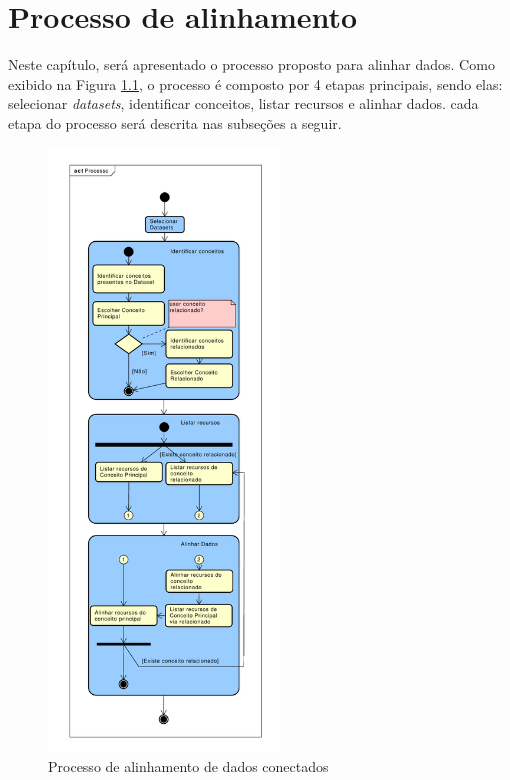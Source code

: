 \chapter{Processo de alinhamento}
\label{cap:processo}
Neste capítulo, será apresentado o processo proposto para alinhar dados. Como exibido na Figura \ref{fig:processo}, o processo é composto por 4 etapas principais, sendo elas: selecionar \textit{datasets}, identificar conceitos, listar recursos e alinhar dados. cada etapa do processo será descrita nas subseções a seguir.

\begin{figure}[!h]
	\centering
	\includegraphics[width=0.55\textwidth]{./imagens/processo.pdf}
    \caption{Processo de alinhamento de dados conectados}
	\label{fig:processo}
\end{figure}

